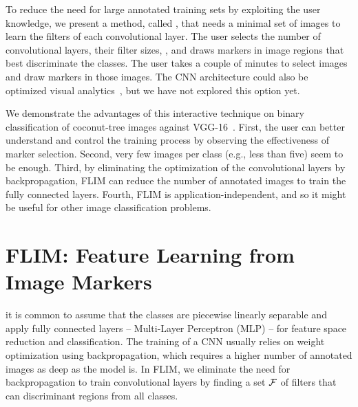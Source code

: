 To reduce the need for large annotated training sets by exploiting the user knowledge, we present a method, called , that needs a minimal set of images to learn the filters of each convolutional layer. The user selects the number of convolutional layers, their filter sizes, , and draws markers in image regions that best discriminate the classes. The user takes a couple of minutes to select images and draw markers in those images.  The CNN architecture could also be optimized  visual analytics~\cite{SpinnerTVCG2020}, but we have not explored this option yet. 

We demonstrate the advantages of this interactive technique on binary classification of coconut-tree images against  VGG-16~\cite{simonyan2014very}. First, the user can better understand and control the training process by observing the effectiveness of marker selection.  Second, very few images per class (e.g., less than five) seem to be enough. Third, by eliminating the optimization of the convolutional layers by backpropagation, FLIM can reduce the number of annotated images to train the fully connected layers. Fourth, FLIM is application-independent, and so it might be useful for other image classification problems.

\section{FLIM: Feature Learning from Image Markers}
\label{sec:method}
  
 it is common to assume that the classes are piecewise linearly separable and apply fully connected layers -- Multi-Layer Perceptron (MLP) -- for feature space reduction and classification. The training of a CNN usually relies on weight optimization using backpropagation, which requires a higher number of annotated images as deep as the model is. In FLIM, we eliminate the need for backpropagation to train convolutional layers by finding a set ${\cal F}$ of filters that can  discriminant regions from all classes.

